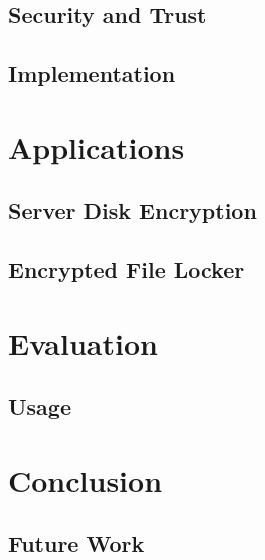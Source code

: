 \documentclass[letterpaper,twocolumn,10pt]{article}
\begin{document}
\subsection{Security and Trust}

\subsection{Implementation}

\section{Applications}
\label{sec:apps}

\subsection{Server Disk Encryption}

\subsection{Encrypted File Locker}

\section{Evaluation}
\label{sec:eval}

\subsection{Usage}

\section{Conclusion}
\label{sec:conclusion}

\subsection{Future Work}

{
  \footnotesize
  
  
}
\end{document}
